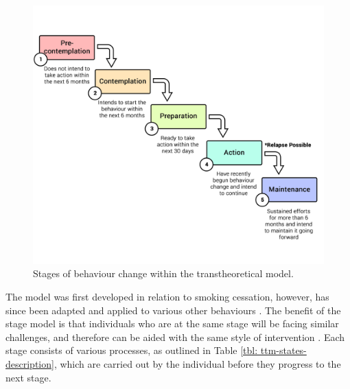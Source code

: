 \begin{figure}[h]
    \centering
    \includegraphics[scale=0.16, angle=0]{Files/prevention-study-1/figures/ttm-stages-model}
    \caption{Stages of behaviour change within the transtheoretical model.}
    \label{fig: ttm-model}
\end{figure}


The model was first developed in relation to smoking cessation, however, has since been adapted and applied to various other behaviours \cite{Nisbet2008}. The benefit of the stage model is that individuals who are at the same stage will be facing similar challenges, and therefore can be aided with the same style of intervention \cite{Morris2012a}. Each stage consists of various processes, as outlined in Table \ref{tbl: ttm-states-description}, which are carried out by the individual before they progress to the next stage.

